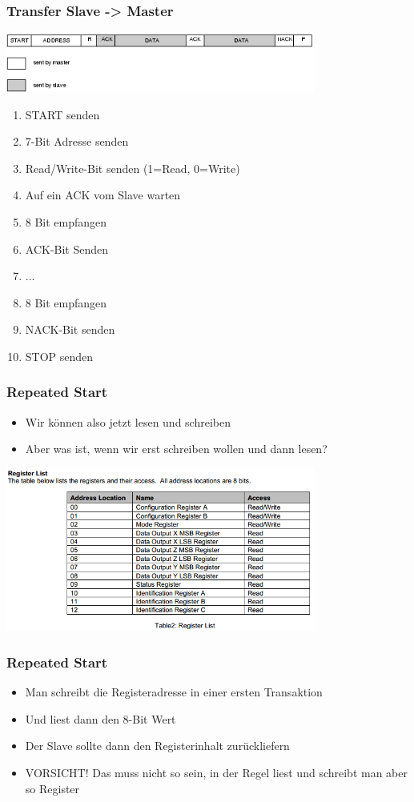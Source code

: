 \documentclass[ngerman,compress]{beamer}
\begin{document}
\begin{frame}
	\frametitle{Transfer Slave -> Master}
	\includegraphics[width=4in]{i2c-tutorial-slave-master}
	\begin{enumerate}
		\item START senden
		\item 7-Bit Adresse senden
		\item Read/Write-Bit senden (1=Read, 0=Write)
		\item Auf ein ACK vom Slave warten
		\item 8 Bit empfangen
		\item ACK-Bit Senden
		\item ...
		\item 8 Bit empfangen
		\item NACK-Bit senden
		\item STOP senden
	\end{enumerate}
\end{frame}

\begin{frame}
	\frametitle{Repeated Start}
	\begin{itemize}
		\item Wir können also jetzt lesen und schreiben
		\item Aber was ist, wenn wir erst schreiben wollen und dann lesen?
	\end{itemize}
	\includegraphics[width=4in]{hmc_regs}
\end{frame}

\begin{frame}
	\frametitle{Repeated Start}
	\begin{itemize}
		\item Man schreibt die Registeradresse in einer ersten Transaktion
		\item Und liest dann den 8-Bit Wert
		\item Der Slave sollte dann den Registerinhalt zurückliefern
		\item VORSICHT! Das muss nicht so sein, in der Regel liest und schreibt man aber so Register
	\end{itemize}
\end{frame}
\end{document}
